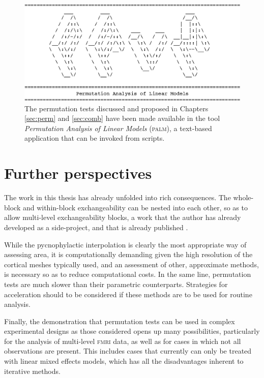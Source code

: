 \begin{figure}[tbp]
\begin{center}
\centerline{\includegraphics[width=12cm]{images/palm.eps}}
\end{center}
\caption[The proposed tests are available in \textsc{palm}.]{The permutation tests discussed and proposed in Chapters \ref{sec:perm} and \ref{sec:comb} have been made available in the tool \emph{Permutation Analysis of Linear Models} (\textsc{palm}), a text-based application that can be invoked from scripts.}
\label{fig:valor:palm}
\end{figure}

\section{Further perspectives}

The work in this thesis has already unfolded into rich consequences. The whole-block and within-block exchangeability can be nested into each other, so as to allow multi-level exchangeability blocks, a work that the author has already developed as a side-project, and that is already published \citep{Winkler2015}.

While the pycnophylactic interpolation is clearly the most appropriate way of assessing area, it is computationally demanding given the high resolution of the cortical meshes typically used, and an assessment of other, approximate methods, is necessary so as to reduce computational costs. In the same line, permutation tests are much slower than their parametric counterparts. Strategies for acceleration should to be considered if these methods are to be used for routine analysis.

Finally, the demonstration that permutation tests can be used in complex experimental designs as those considered opens up many possibilities, particularly for the analysis of multi-level \textsc{fmri} data, as well as for cases in which not all observations are present. This includes cases that currently can only be treated with linear mixed effects models, which has all the disadvantages inherent to iterative methods.